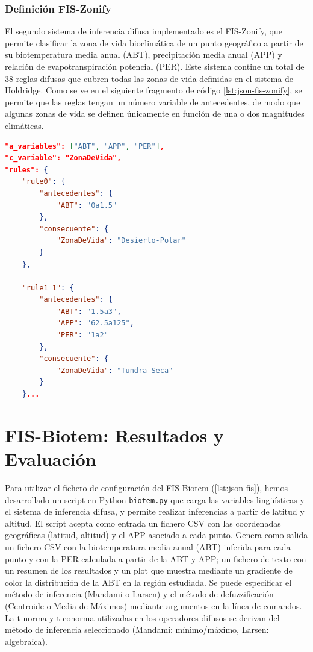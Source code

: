\documentclass[11pt,a4paper]{article}
\begin{document}
\subsubsection{Definición FIS-Zonify}

El segundo sistema de inferencia difusa implementado es el FIS-Zonify, que permite clasificar la zona de vida bioclimática
de un punto geográfico a partir de su biotemperatura media anual (ABT), precipitación media anual (APP) y relación de evapotranspiración potencial (PER).
Este sistema contine un total de 38 reglas difusas que cubren todas las zonas de vida definidas en el sistema de Holdridge. 
Como se ve en el siguiente fragmento de código \ref{lst:json-fis-zonify}, se permite que las reglas tengan un número variable de antecedentes,
de modo que algunas zonas de vida se definen únicamente en función de una o dos magnitudes climáticas.

\begin{lstlisting}[language=JSON, caption={Definición del sistema de inferencia difusa FIS-Zonify}, label={lst:json-fis-zonify}] 
"a_variables": ["ABT", "APP", "PER"],
"c_variable": "ZonaDeVida",
"rules": {
    "rule0": {
        "antecedentes": {
            "ABT": "0a1.5"
        },
        "consecuente": {
            "ZonaDeVida": "Desierto-Polar"
        }
    },

    "rule1_1": {
        "antecedentes": {
            "ABT": "1.5a3",
            "APP": "62.5a125",
            "PER": "1a2"
        },
        "consecuente": {
            "ZonaDeVida": "Tundra-Seca"
        }
    }...
\end{lstlisting}

\clearpage

\section{FIS-Biotem: Resultados y Evaluación}

Para utilizar el fichero de configuración del FIS-Biotem (\ref{lst:json-fis}), hemos desarrollado un script en Python \texttt{biotem.py}
que carga las variables lingüísticas y el sistema de inferencia difusa, y permite realizar inferencias a partir de latitud y altitud.
El script acepta como entrada un fichero CSV con las coordenadas geográficas (latitud, altitud) y el APP asociado a cada punto. 
Genera como salida un fichero CSV con la biotemperatura media anual (ABT) inferida para cada punto y con la PER calculada a partir de la ABT y APP;
un fichero de texto con un resumen de los resultados y un plot que muestra mediante un gradiente de color la distribución de la ABT en la región estudiada.
Se puede especificar el método de inferencia (Mandami o Larsen) y el método de defuzzificación (Centroide o Media de Máximos) mediante argumentos en la línea de comandos.
La t-norma y t-conorma utilizadas en los operadores difusos se derivan del método de inferencia seleccionado (Mandami: mínimo/máximo, Larsen: algebraica).
\end{document}
